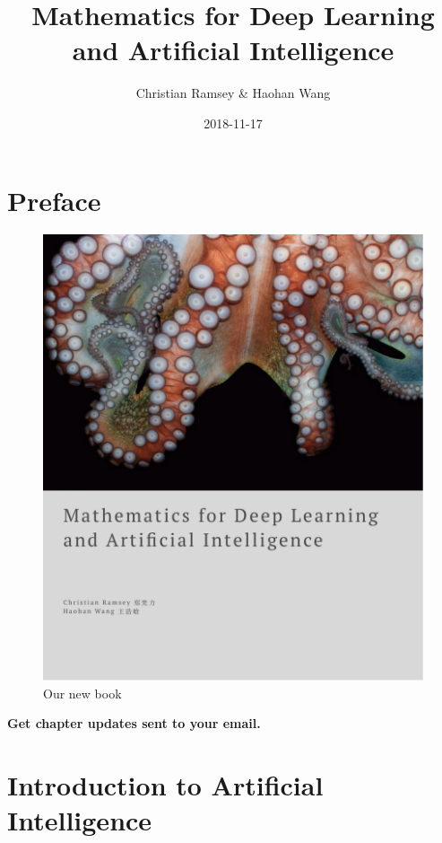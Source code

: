 \documentclass[]{book}
\title{Mathematics for Deep Learning and Artificial Intelligence}
\author{Christian Ramsey \& Haohan Wang}
\date{2018-11-17}
\theoremstyle{definition}
\theoremstyle{definition}
\theoremstyle{definition}
\theoremstyle{remark}
\begin{document}
\maketitle

{
\hypersetup{linkcolor=black}
\setcounter{tocdepth}{1}
\tableofcontents
}
\chapter*{Preface}\label{preface}

\begin{figure}
\centering
\includegraphics{artwork/maths of deep learning.png}
\caption{Our new book}
\end{figure}

\textbf{Get chapter updates sent to your email.}

\hypertarget{mc_embed_signup}{}
\hypertarget{mc_embed_signup_scroll}{}

\chapter{Introduction to Artificial Intelligence}\label{intro}
\end{document}
